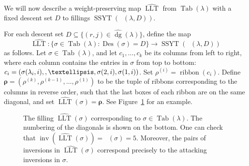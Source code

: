 \documentclass[11pt]{article}
\theoremstyle{definition}
\numberwithin{equation}{section}
\DeclareMathOperator{\PQT}{Tab}
\DeclareMathOperator{\dg}{dg}
\DeclareMathOperator{\inv}{inv}
\DeclareMathOperator{\Des}{Des}
\DeclareMathOperator{\ribbon}{ribbon}
\DeclareMathOperator{\SSYT}{SSYT}
\DeclareMathOperator{\LLT}{LLT}
\DeclareMathOperator{\boldnu}{\widehat{\boldsymbol{\nu}}}
\DeclareMathOperator{\invtwo}{\widehat{\inv}}
\newlength\cellsize \setlength\cellsize{12\unitlength}
\newcommand\cellify[1]{\def\thearg{#1}\def\nothing{}%
\ifx\thearg\nothing
\vrule width0pt height\cellsize depth0pt\else
\hbox to 0pt{\usebox2\hss}\fi%
\vbox to 12\unitlength{
\vss
\hbox to 12\unitlength{\hss$#1$\hss}
\vss}}
\newcommand\tableau[1]{\vtop{\let\\=\cr
\setlength\baselineskip{-16000pt}
\setlength\lineskiplimit{16000pt}
\setlength\lineskip{0pt}
\halign{&\cellify{##}\cr#1\crcr}}}
\begin{document}
We will now describe a weight-preserving map $\widehat{\LLT}$ from $\PQT(\lambda)$ with a fixed descent set $D$ to fillings $\SSYT(\boldnu(\lambda,D))$.


\begin{defn}\label{def:LLTtwo}
For each descent set $D \subseteq \{(r,j) \in \widehat{\dg}(\lambda)\}$, define the map 
\[
\widehat{\LLT}: \{\sigma\in \PQT(\lambda):\Des(\sigma)=D\} \rightarrow \SSYT(\boldnu(\lambda,D))
\] 
as follows. Let $\sigma\in\PQT(\lambda)$, and let $c_1,\ldots,c_k$ be its columns from left to right, where each column contains the entries in $\sigma$ from top to bottom: $c_i = (\sigma(\lambda_i,i),\linebreak[0],\ldots,\sigma(2,i),\sigma(1,i))$. 
Set $\rho^{(i)} = \ribbon(c_i)$. 
Define $\boldsymbol{\rho}=(\rho^{(k)},\rho^{(k-1)},\ldots,\rho^{(1)})$ to be the tuple of ribbons corresponding to the columns in reverse order, such that the last boxes of each ribbon are on the same diagonal, and set $\widehat{\LLT}(\sigma) = \boldsymbol{\rho}$. See Figure~\ref{fig:LLT_T} for an example.
\end{defn}

\begin{figure}[h]
\centering
{}
\caption{The filling $\widehat{\LLT}(\sigma)$ corresponding to $\sigma\in\PQT(\lambda)$. The numbering of the diagonals is shown on the bottom. One can check that $\inv(\widehat{\LLT}(\sigma))=\invtwo(\sigma) = 5$. Moreover, the pairs of inversions in $\widehat{\LLT}(\sigma)$
correspond precisely to the attacking inversions in $\sigma$.
}
\label{fig:LLT_T}
\end{figure}
\end{document}
